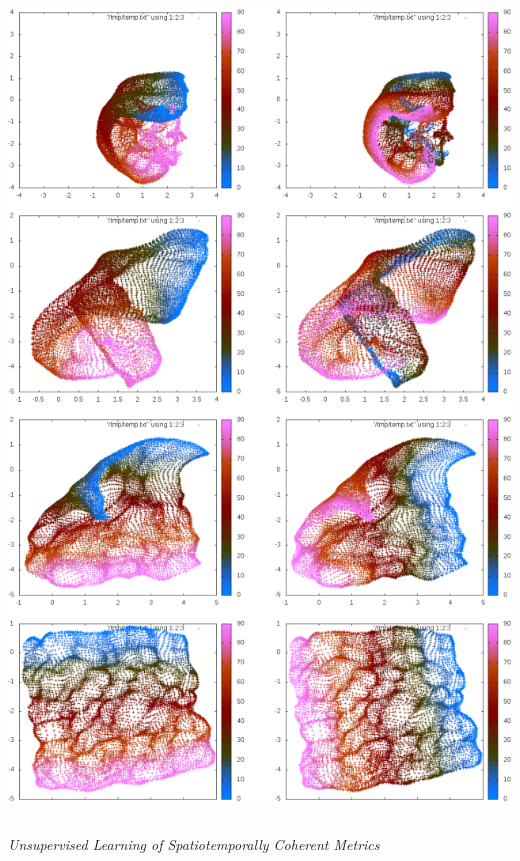 \documentclass{beamer}
\begin{document}
\begin{frame}
\begin{columns}[T]
\begin{column}{.5\textwidth}
\includegraphics[scale=0.20]{./Figures/drlim.png}
\end{column}
\end{columns}
\end{frame} 

\begin{frame}
\begin{center} 
\huge \color{blue} \emph{Unsupervised Learning of Spatiotemporally Coherent Metrics}
\end{center} 
\end{frame}
\end{document}
